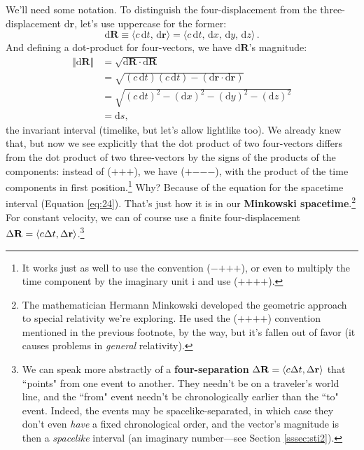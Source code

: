 \documentclass[12pt]{article}
\renewcommand{\vv}[1]{\mathbf{#1}}
\newcommand{\dd}[1]{\mathrm{d}#1}
\begin{document}
We'll need some notation. To distinguish the four-displacement from the three-displacement $\dd \vv r$, let's use uppercase for the former:
\begin{equation}\label{eq:30}
\boxed{\dd \vv R \equiv \langle c \, \dd t, \, \dd \vv r \rangle = \langle c\, \dd t, \, \dd x, \, \dd y, \, \dd z \rangle} \, .
\end{equation}
And defining a dot-product for four-vectors, we have $\dd \vv R$'s magnitude:
\begin{equation*}
\begin{split}
\Vert \dd \vv R \Vert &= \sqrt{\dd \vv R \cdot \dd \vv R}\\
&= \sqrt{(c \, \dd t)(c \, \dd t) - (\dd \vv r \cdot \dd \vv r)}\\
&= \sqrt{(c \, \dd t)^2 - (\dd x)^2 - (\dd y)^2 - (\dd z)^2}\\
&= \dd s,
\end{split}
\end{equation*}
the invariant interval (timelike, but let's allow lightlike too). We already knew that, but now we see explicitly that the dot product of two four-vectors differs from the dot product of two three-vectors by the signs of the products of the components: instead of ($+$$+$$+$), we have ($+$$-$$-$$-$), with the product of the time components in first position.\footnote{\label{fn:sc}It works just as well to use the convention ($-$$+$$+$$+$), or even to multiply the time component by the imaginary unit $\mathrm{i}$ and use ($+$$+$$+$$+$).} Why? Because of the equation for the spacetime interval (Equation \ref{eq:24}). That's just how it is in our \textbf{Minkowski spacetime}.\footnote{The mathematician Hermann Minkowski developed the geometric approach to special relativity we're exploring. He used the ($+$$+$$+$$+$) convention mentioned in the previous footnote, by the way, but it's fallen out of favor (it causes problems in \emph{general} relativity).} For constant velocity, we can of course use a finite four-displacement $\Delta \vv R = \langle c \mkern.5mu \Delta t, \Delta \vv r \rangle$.\footnote{\label{fn:sp}We can speak more abstractly of a \textbf{four-separation} $\Delta \vv R = \langle c \mkern.5mu \Delta t, \Delta \vv r \rangle$ that ``points" from one event to another. They needn't be on a traveler's world line, and the ``from" event needn't be chronologically earlier than the ``to" event. Indeed, the events may be spacelike-separated, in which case they don't even \emph{have} a fixed chronological order, and the vector's magnitude is then a \emph{spacelike} interval (an imaginary number---see Section \ref{sssec:sti2}).}
\end{document}
